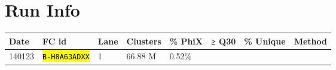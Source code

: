 \documentclass[12pt]{article}
\let\OldTexttt\texttt
\renewcommand{\texttt}[1]{\OldTexttt{\small\hl{#1}}}
\begin{document}
\section{Run Info}\label{run-info}

\begin{longtable}[c]{@{}llllllll@{}}
\toprule
\begin{minipage}[b]{0.08\columnwidth}\raggedright\strut
Date
\strut\end{minipage} &
\begin{minipage}[b]{0.13\columnwidth}\raggedright\strut
FC id
\strut\end{minipage} &
\begin{minipage}[b]{0.07\columnwidth}\raggedright\strut
Lane
\strut\end{minipage} &
\begin{minipage}[b]{0.11\columnwidth}\raggedright\strut
Clusters
\strut\end{minipage} &
\begin{minipage}[b]{0.09\columnwidth}\raggedright\strut
\% PhiX
\strut\end{minipage} &
\begin{minipage}[b]{0.09\columnwidth}\raggedright\strut
≥ Q30
\strut\end{minipage} &
\begin{minipage}[b]{0.12\columnwidth}\raggedright\strut
\% Unique
\strut\end{minipage} &
\begin{minipage}[b]{0.09\columnwidth}\raggedright\strut
Method
\strut\end{minipage}\tabularnewline
\midrule
\endhead
\begin{minipage}[t]{0.08\columnwidth}\raggedright\strut
140123
\strut\end{minipage} &
\begin{minipage}[t]{0.13\columnwidth}\raggedright\strut
\texttt{B-H8A63ADXX}
\strut\end{minipage} &
\begin{minipage}[t]{0.07\columnwidth}\raggedright\strut
1
\strut\end{minipage} &
\begin{minipage}[t]{0.11\columnwidth}\raggedright\strut
66.88 M
\strut\end{minipage} &
\begin{minipage}[t]{0.09\columnwidth}\raggedright\strut
0.52\%
\strut\end{minipage} &
\begin{minipage}[t]{0.09\columnwidth}\raggedright\strut

\end{minipage}
\end{longtable}
\end{document}
